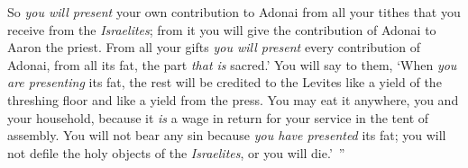 \begin{biblechapter}
\verse So \textit{you will present} your own contribution to Adonai from all your tithes that you receive from the \textit{Israelites}; from it you will give the contribution of Adonai to Aaron the priest.
\verse From all your gifts \textit{you will present} every contribution of Adonai, from all its fat, the part \textit{that is} sacred.’
\verse You will say to them, ‘When \textit{you are presenting} its fat, the rest will be credited to the Levites like a yield of the threshing floor and like a yield from the press.
\verse You may eat it anywhere, you and your household, because it \textit{is} a wage in return for your service in the tent of assembly.
\verse You will not bear any sin because \textit{you have presented} its fat; you will not defile the holy objects of the \textit{Israelites}, or you will die.’ ”
\end{biblechapter}

